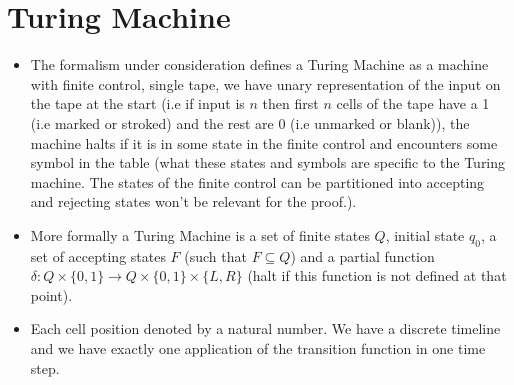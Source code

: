 \documentclass[
11pt,notheorems,hyperref={pdfauthor=whatever}
]{beamer}
\begin{document}
\section{Turing Machine}
\begin{frame}
\begin{itemize}
    \setlength\itemsep{1em}
    \item The formalism under consideration defines a Turing Machine as a machine with finite control, single tape, we have unary representation of the input on the tape at the start (i.e if input is $n$ then first $n$ cells of the tape have a 1 (i.e marked or stroked) and the rest are 0 (i.e unmarked or blank)), the machine halts if it is in some state in the finite control and encounters some symbol in the table (what these states and symbols are specific to the Turing machine. The states of the finite control can be partitioned into accepting and rejecting states won't be relevant for the proof.).
    \item More formally a Turing Machine is a set of finite states $Q$, initial state $q_0$, a set of accepting states $F$ (such that $F \subseteq Q$) and a partial function $\delta : Q \times \{0, 1\} \to Q \times \{0, 1\} \times \{L, R\}$ (halt if this function is not defined at that point).
    \item Each cell position denoted by a natural number. We have a discrete timeline and we have exactly one application of the transition function in one time step.
\end{itemize}
\end{frame}
\end{document}
